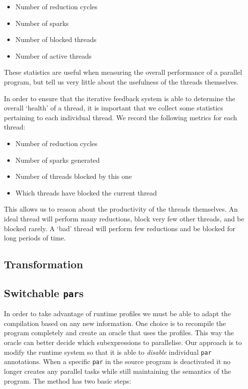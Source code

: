     \begin{itemize}
        \item Number of reduction cycles
        \item Number of sparks
        \item Number of blocked threads
        \item Number of active threads
    \end{itemize}

    These statistics are useful when measuring the overall performance of a
parallel program, but tell us very little about the usefulness of the threads
themselves.

    In order to ensure that the iterative feedback system is able to determine
the overall `health' of a thread, it is important that we collect some
statistics pertaining to each individual thread. We record the following metrics
for each thread:
    \begin{itemize}
        \item Number of reduction cycles
        \item Number of sparks generated
        \item Number of threads blocked by this one
        \item Which threads have blocked the current thread
    \end{itemize}

    This allows us to reason about the productivity of the threads themselves.
An ideal thread will perform many reductions, block very few other threads, and
be blocked rarely. A `bad' thread will perform few reductions and be blocked for
long periods of time.

\subsection*{Transformation}

\subsection{Switchable \texttt{par}s}
\label{sec:switchPar}

    In order to take advantage of runtime profiles we must be able to adapt the
compilation based on any new information.  One choice is to recompile the
program completely and create an oracle that uses the profiles. This way the
oracle can better decide which subexpressions to parallelise. Our approach is to
modify the runtime system so that it is able to \emph{disable} individual
\verb-par- annotations. When a specific \verb=par= in the source program is
deactivated it no longer creates any parallel tasks while still maintaining the
semantics of the program.  The method has two basic steps:

